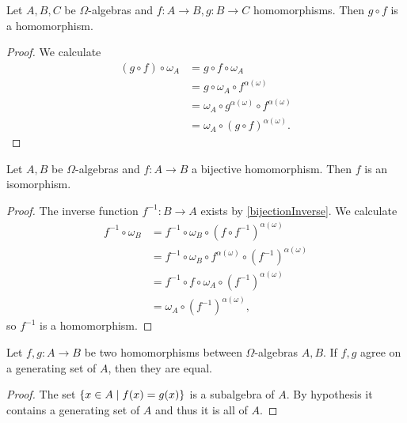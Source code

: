 \begin{lemma}
Let $A,B, C$ be $\Omega$-algebras and $f:A\to B, g: B\to C$ homomorphisms. Then $g\circ f$ is a homomorphism.
\end{lemma}
\begin{proof}
We calculate
\begin{align*}
(g\circ f)\circ \omega_A &= g\circ f\circ \omega_A \\
&= g\circ \omega_A \circ f^{\alpha(\omega)} \\
&= \omega_A \circ g^{\alpha(\omega)} \circ f^{\alpha(\omega)} \\
&= \omega_A \circ (g \circ f)^{\alpha(\omega)}.
\end{align*}
\end{proof}

\begin{lemma} \label{inverseHomomorphism}
Let $A,B$ be $\Omega$-algebras and $f:A\to B$ a bijective homomorphism. Then $f$ is an isomorphism.
\end{lemma}
\begin{proof}
The inverse function $f^{-1}: B\to A$ exists by \ref{bijectionInverse}. We calculate
\begin{align*}
f^{-1}\circ \omega_B &= f^{-1}\circ \omega_B \circ (f\circ f^{-1})^{\alpha(\omega)} \\
&= f^{-1}\circ \omega_B \circ f^{\alpha(\omega)} \circ (f^{-1})^{\alpha(\omega)} \\
&= f^{-1}\circ f \circ \omega_A \circ (f^{-1})^{\alpha(\omega)} \\
&= \omega_A \circ (f^{-1})^{\alpha(\omega)},
\end{align*}
so $f^{-1}$ is a homomorphism.
\end{proof}

\begin{proposition}
Let $f,g:A\to B$ be two homomorphisms between $\Omega$-algebras $A,B$. If $f,g$ agree on a generating set of $A$, then they are equal.
\end{proposition}
\begin{proof}
The set $\setbuilder{x\in A}{f(x) = g(x)}$ is a subalgebra of $A$. By hypothesis it contains a generating set of $A$ and thus it is all of $A$.
\end{proof}


